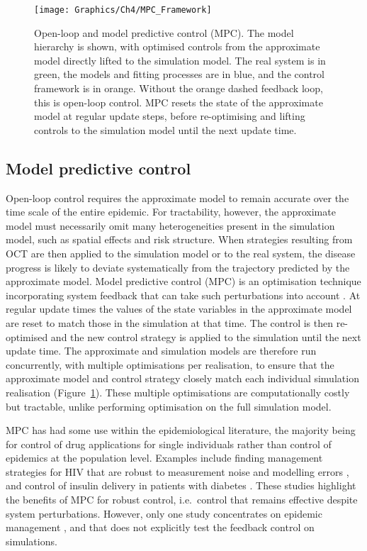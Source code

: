 \begin{figure}[htb]
    \begin{center}
        \texttt{[image: Graphics/Ch4/MPC\_Framework]}
        \caption{Open-loop and model predictive control (MPC). The model hierarchy is shown, with optimised controls from the approximate model directly lifted to the simulation model. The real system is in green, the models and fitting processes are in blue, and the control framework is in orange. Without the orange dashed feedback loop, this is open-loop control. MPC resets the state of the approximate model at regular update steps, before re-optimising and lifting controls to the simulation model until the next update time.}
        \label{fig:ch4:mpc_framework}
    \end{center}
\end{figure}

\subsection*{Model predictive control}

Open-loop control requires the approximate model to remain accurate over the time scale of the entire epidemic. For tractability, however, the approximate model must necessarily omit many heterogeneities present in the simulation model, such as spatial effects and risk structure. When strategies resulting from OCT are then applied to the simulation model or to the real system, the disease progress is likely to deviate systematically from the trajectory predicted by the approximate model. Model predictive control (MPC) is an optimisation technique incorporating system feedback that can take such perturbations into account \citep{camacho_model_2012, lee_model_2011}. At regular update times the values of the state variables in the approximate model are reset to match those in the simulation at that time. The control is then re-optimised and the new control strategy is applied to the simulation until the next update time. The approximate and simulation models are therefore run concurrently, with multiple optimisations per realisation, to ensure that the approximate model and control strategy closely match each individual simulation realisation (Figure~\ref{fig:ch4:mpc_framework}). These multiple optimisations are computationally costly but tractable, unlike performing optimisation on the full simulation model.

MPC has had some use within the epidemiological literature, the majority being for control of drug applications for single individuals rather than control of epidemics at the population level. Examples include finding management strategies for HIV that are robust to measurement noise and modelling errors \citep{zurakowski_model_2006, david_receding_2011}, and control of insulin delivery in patients with diabetes \citep{hovorka_nonlinear_2004}. These studies highlight the benefits of MPC for robust control, i.e.\ control that remains effective despite system perturbations. However, only one study concentrates on epidemic management \citep{selley_dynamic_2015}, and that does not explicitly test the feedback control on simulations.

